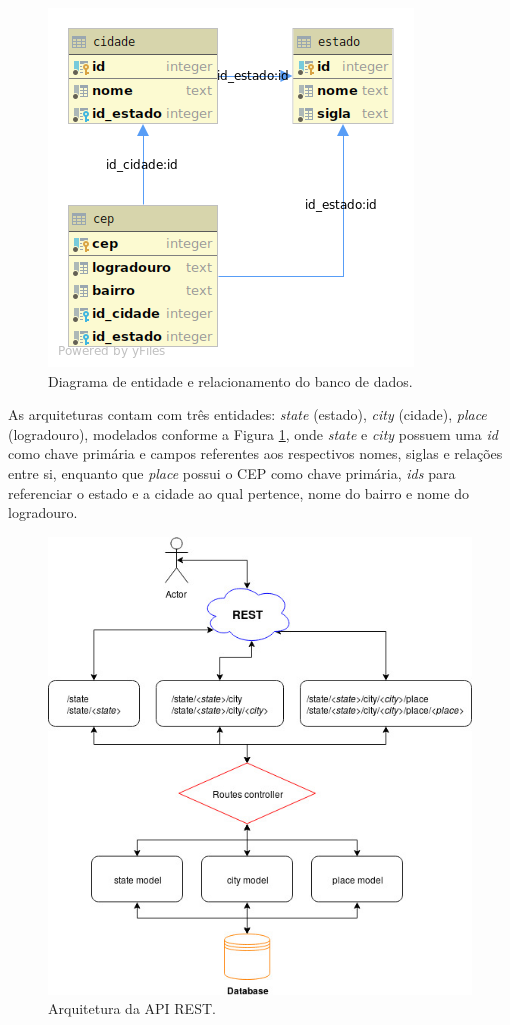 \documentclass[conference]{IEEEtran}
\begin{document}
\begin{figure}[htbp]
\centerline{\includegraphics[scale=0.45]{imgs/database.png}}
\caption{Diagrama de entidade e relacionamento do banco de dados.}
\label{fig:der_database}
\end{figure}

As arquiteturas contam com três entidades: \textit{state} (estado), \textit{city} (cidade), \textit{place} (logradouro), modelados conforme a Figura \ref{fig:der_database}, onde \textit{state} e \textit{city} possuem uma \textit{id} como chave primária e campos referentes aos respectivos nomes, siglas e relações entre si, enquanto que \textit{place} possui o CEP como chave primária, \textit{ids} para referenciar o estado e a cidade ao qual pertence, nome do bairro e nome do logradouro.

\begin{figure}[htbp]
\centerline{\includegraphics[scale=0.45]{imgs/da_rest.jpg}}
\caption{Arquitetura da API REST.}
\label{fig:arq_rest}
\end{figure}
\end{document}

